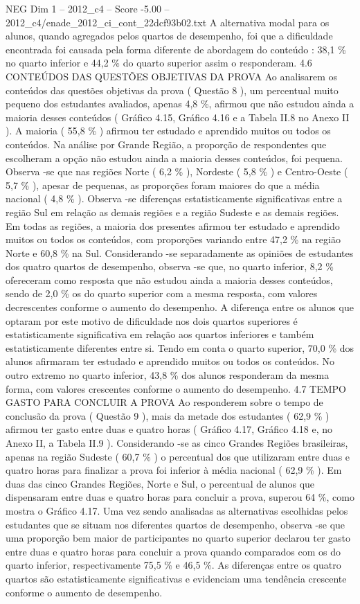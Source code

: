 \begin{textsample}{NEG Dim 1 – 2012\_c4 – Score -5.00 – 2012\_c4/enade\_2012\_ci\_cont\_22dcf93b02.txt}
A alternativa modal para os alunos, quando agregados pelos quartos de desempenho, foi que a dificuldade encontrada foi causada pela forma diferente de abordagem do conteúdo : 38,1 \% no quarto inferior e 44,2 \% do quarto superior assim o responderam. 4.6 CONTEÚDOS DAS QUESTÕES OBJETIVAS DA PROVA Ao analisarem os conteúdos das questões objetivas da prova ( Questão 8 ), um percentual muito pequeno dos estudantes avaliados, apenas 4,8 \%, afirmou que não estudou ainda a maioria desses conteúdos ( Gráfico 4.15, Gráfico 4.16 e a Tabela II.8 no Anexo II ).
A maioria ( 55,8 \% ) afirmou ter estudado e aprendido muitos ou todos os conteúdos.
Na análise por Grande Região, a proporção de respondentes que escolheram a opção não estudou ainda a maioria desses conteúdos, foi pequena.
Observa -se que nas regiões Norte ( 6,2 \% ), Nordeste ( 5,8 \% ) e Centro-Oeste ( 5,7 \% ), apesar de pequenas, as proporções foram maiores do que a média nacional ( 4,8 \% ).
Observa -se diferenças estatisticamente significativas entre a região Sul em relação as demais regiões e a região Sudeste e as demais regiões.
Em todas as regiões, a maioria dos presentes afirmou ter estudado e aprendido muitos ou todos os conteúdos, com proporções variando entre 47,2 \% na região Norte e 60,8 \% na Sul.
Considerando -se separadamente as opiniões de estudantes dos quatro quartos de desempenho, observa -se que, no quarto inferior, 8,2 \% ofereceram como resposta que não estudou ainda a maioria desses conteúdos, sendo de 2,0 \% os do quarto superior com a mesma resposta, com valores decrescentes conforme o aumento do desempenho.
A diferença entre os alunos que optaram por este motivo de dificuldade nos dois quartos superiores é estatisticamente significativa em relação aos quartos inferiores e também estatisticamente diferentes entre si.
Tendo em conta o quarto superior, 70,0 \% dos alunos afirmaram ter estudado e aprendido muitos ou todos os conteúdos.
No outro extremo no quarto inferior, 43,8 \% dos alunos responderam da mesma forma, com valores crescentes conforme o aumento do desempenho. 4.7 TEMPO GASTO PARA CONCLUIR A PROVA Ao responderem sobre o tempo de conclusão da prova ( Questão 9 ), mais da metade dos estudantes ( 62,9 \% ) afirmou ter gasto entre duas e quatro horas ( Gráfico 4.17, Gráfico 4.18 e, no Anexo II, a Tabela II.9 ).
Considerando -se as cinco Grandes Regiões brasileiras, apenas na região Sudeste ( 60,7 \% ) o percentual dos que utilizaram entre duas e quatro horas para finalizar a prova foi inferior à média nacional ( 62,9 \% ).
Em duas das cinco Grandes Regiões, Norte e Sul, o percentual de alunos que dispensaram entre duas e quatro horas para concluir a prova, superou 64 \%, como mostra o Gráfico 4.17.
Uma vez sendo analisadas as alternativas escolhidas pelos estudantes que se situam nos diferentes quartos de desempenho, observa -se que uma proporção bem maior de participantes no quarto superior declarou ter gasto entre duas e quatro horas para concluir a prova quando comparados com os do quarto inferior, respectivamente 75,5 \% e 46,5 \%.
As diferenças entre os quatro quartos são estatisticamente significativas e evidenciam uma tendência crescente conforme o aumento de desempenho.


\end{textsample}
